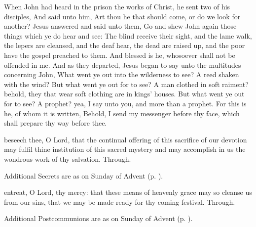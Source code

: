  When John had heard in the prison the works of Christ, he sent two of his disciples, And said unto him, Art thou he that should come, or do we look for another? Jesus answered and said unto them, Go and shew John again those things which ye do hear and see: The blind receive their sight, and the lame walk, the lepers are cleansed, and the deaf hear, the dead are raised up, and the poor have the gospel preached to them. And blessed is he, whosoever shall not be offended in me. And as they departed, Jesus began to say unto the multitudes concerning John, What went ye out into the wilderness to see? A reed shaken with the wind? But what went ye out for to see? A man clothed in soft raiment? behold, they that wear soft clothing are in kings' houses. But what went ye out for to see? A prophet? yea, I say unto you, and more than a prophet. For this is he, of whom it is written, Behold, I send my messenger before thy face, which shall prepare thy way before thee.

\secret
{} beseech thee, O Lord, that the continual offering of this sacrifice of our devotion may fulfil thine institution of this sacred mystery and may accomplish in us the wondrous work of thy salvation. Through.
\begin{rubric}
    Additional Secrets are as on  Sunday of Advent (p. \pageref{AdventI}).
\end{rubric}
\postcommunion
{} entreat, O Lord, thy mercy: that these means of heavenly grace may so cleanse us from our sins, that we may be made ready for thy coming festival. Through.
\begin{rubric}
    Additional Postcommunions are as on  Sunday of Advent (p. \pageref{AdventI}).
\end{rubric}


